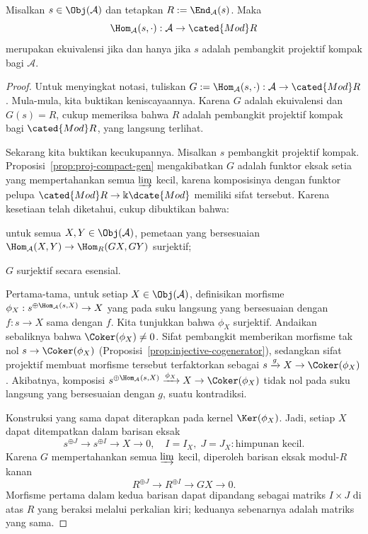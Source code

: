 \begin{theorem}[P.\ Gabriel]\label{prop:identify-ModR}
	Misalkan $s\in\Obj(\mathcal{A})$ dan tetapkan
	$R:=\End_{\mathcal{A}}(s)$. Maka
	\[ \Hom_{\mathcal{A}}(s, \cdot): \mathcal{A} \to \cated{Mod}R \]
	merupakan ekuivalensi jika dan hanya jika $s$ adalah pembangkit projektif
	kompak bagi $\mathcal{A}$.
\end{theorem}
\begin{proof}
	Untuk menyingkat notasi, tuliskan
	$G:=\Hom_{\mathcal{A}}(s,\mathord\cdot):\mathcal{A}\to\cated{Mod}R$.
	Mula-mula, kita buktikan keniscayaannya. Karena $G$ adalah ekuivalensi dan
	$G(s)=R$, cukup memeriksa bahwa $R$ adalah pembangkit projektif kompak bagi
	$\cated{Mod}R$, yang langsung terlihat.

	Sekarang kita buktikan kecukupannya. Misalkan $s$ pembangkit projektif kompak.
	Proposisi~\ref{prop:proj-compact-gen} mengakibatkan $G$ adalah funktor eksak
	setia yang mempertahankan semua $\varinjlim$ kecil, karena komposisinya
	dengan funktor pelupa $\cated{Mod}R\to\Bbbk\dcate{Mod}$ memiliki sifat
	tersebut. Karena kesetiaan telah diketahui, cukup dibuktikan bahwa:
	\begin{compactitem}
		\item untuk semua $X,Y\in\Obj(\mathcal{A})$, pemetaan yang bersesuaian
		$\Hom_{\mathcal{A}}(X,Y)\to\Hom_R(GX,GY)$ surjektif;
		\item $G$ surjektif secara esensial.
	\end{compactitem}

	Pertama-tama, untuk setiap $X\in\Obj(\mathcal{A})$, definisikan morfisme
	$\phi_X:s^{\oplus\Hom_{\mathcal{A}}(s,X)}\to X$ yang pada suku langsung
	yang bersesuaian dengan $f:s\to X$ sama dengan $f$. Kita tunjukkan bahwa
	$\phi_X$ surjektif. Andaikan sebaliknya bahwa
	$\Coker(\phi_X)\neq0$. Sifat pembangkit memberikan morfisme tak nol
	$s\to\Coker(\phi_X)$ (Proposisi~\ref{prop:injective-cogenerator}), sedangkan
	sifat projektif membuat morfisme tersebut terfaktorkan sebagai
	$s\xrightarrow{g}X\to\Coker(\phi_X)$. Akibatnya, komposisi
	$s^{\oplus\Hom_{\mathcal{A}}(s,X)}\xrightarrow{\phi_X}X
	\to\Coker(\phi_X)$ tidak nol pada suku langsung yang bersesuaian dengan
	$g$, suatu kontradiksi.

	Konstruksi yang sama dapat diterapkan pada kernel $\Ker(\phi_X)$. Jadi,
	setiap $X$ dapat ditempatkan dalam barisan eksak
	\[ s^{\oplus J} \to s^{\oplus I} \to X \to 0, \quad I = I_X, \; J = J_X: \text{himpunan kecil}. \]
	Karena $G$ mempertahankan semua $\varinjlim$ kecil, diperoleh barisan eksak
	modul-$R$ kanan
	\[ R^{\oplus J} \to R^{\oplus I} \to GX \to 0. \]
	Morfisme pertama dalam kedua barisan dapat dipandang sebagai matriks
	$I\times J$ di atas $R$ yang beraksi melalui perkalian kiri; keduanya
	sebenarnya adalah matriks yang sama.


\end{proof}
